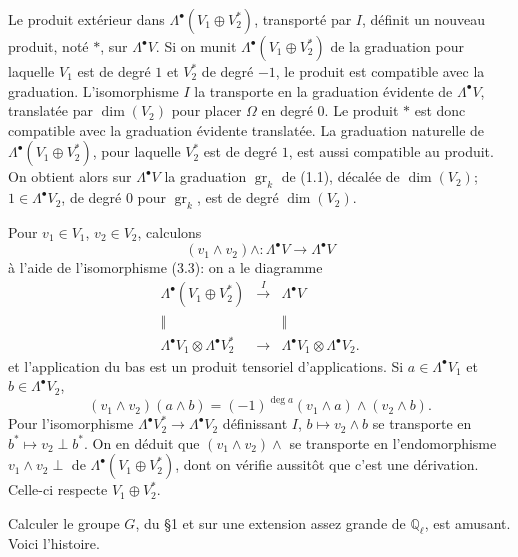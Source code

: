 \documentclass[11pt]{article}
\newcommand{\Q}{\mathbb Q}
\newcommand{\gr}{\operatorname{gr}}
\theoremstyle{deligne}
\newcommand{\heading}[1]{\vspace{0.7em}\noindent{\bfseries #1}\quad}
\begin{document}
Le produit extérieur dans $\Lambda^\bullet(V_1\oplus V_2^*)$, transporté par $I$, définit un nouveau produit, noté $*$, sur $\Lambda^\bullet V$. Si on munit $\Lambda^\bullet(V_1\oplus V_2^*)$ de la graduation pour laquelle $V_1$ est de degré $1$ et $V_2^*$ de degré $-1$, le produit est compatible avec la graduation. L'isomorphisme $I$ la transporte en la graduation évidente de $\Lambda^\bullet V$, translatée par $\dim(V_2)$ pour placer $\Omega$ en degré $0$. Le produit $*$ est donc compatible avec la graduation évidente translatée. La graduation naturelle de $\Lambda^\bullet(V_1\oplus V_2^*)$, pour laquelle $V_2^*$ est de degré $1$, est aussi compatible au produit. On obtient alors sur $\Lambda^\bullet V$ la graduation $\gr_k$ de (1.1), décalée de $\dim(V_2)$; $1\in\Lambda^\bullet V_2$, de degré $0$ pour $\gr_k$, est de degré $\dim(V_2)$.

Pour $v_1\in V_1$, $v_2\in V_2$, calculons
\[
(v_1\wedge v_2)\wedge:\Lambda^\bullet V\longrightarrow\Lambda^\bullet V
\]
à l'aide de l'isomorphisme (3.3): on a le diagramme
\[
\begin{array}{ccc}
\Lambda^\bullet(V_1\oplus V_2^*) & \xrightarrow{\ I\ } & \Lambda^\bullet V \\
\Big\Vert && \Big\Vert \\
\Lambda^\bullet V_1\otimes\Lambda^\bullet V_2^* & \longrightarrow & \Lambda^\bullet V_1\otimes\Lambda^\bullet V_2 .
\end{array}
\]
et l'application du bas est un produit tensoriel d'applications. Si $a\in\Lambda^\bullet V_1$ et $b\in\Lambda^\bullet V_2$,
\[
(v_1\wedge v_2)(a\wedge b)=(-1)^{\deg a}(v_1\wedge a)\wedge(v_2\wedge b).
\]
Pour l'isomorphisme $\Lambda^\bullet V_2^*\to\Lambda^\bullet V_2$ définissant $I$, $b\mapsto v_2\wedge b$ se transporte en $b^*\mapsto v_2\perp b^*$. On en déduit que $(v_1\wedge v_2)\wedge$ se transporte en l'endomorphisme $v_1\wedge v_2\perp$ de $\Lambda^\bullet(V_1\oplus V_2^*)$, dont on vérifie aussitôt que c'est une dérivation. Celle-ci respecte $V_1\oplus V_2^*$.

\heading{4.}
Calculer le groupe $G$, du \S1 et sur une extension assez grande de $\Q_\ell$, est amusant. Voici l'histoire.
\end{document}
